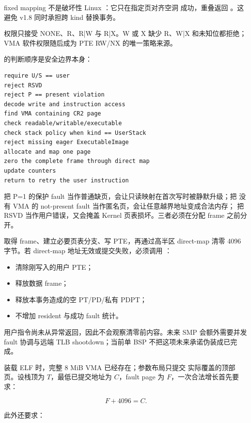 fixed mapping 不是破坏性 Linux ：它只在指定页对齐空洞
成功，重叠返回 。这避免 v1.8 同时承担跨 kind 替换事务。

权限只接受 NONE、R、R|W 与 R|X。W 或 X 缺少 R、W|X 和未知位都拒绝；
VMA 软件权限随后成为 PTE RW/NX 的唯一策略来源。

 的判断顺序是安全边界本身：

\begin{lstlisting}[caption={用户页故障决策顺序}]
require U/S == user
reject RSVD
reject P == present violation
decode write and instruction access
find VMA containing CR2 page
check readable/writable/executable
check stack policy when kind == UserStack
reject missing eager ExecutableImage
allocate and map one page
zero the complete frame through direct map
update counters
return to retry the user instruction
\end{lstlisting}

\begin{failurebox}
把 P=1 的保护 fault 当作普通缺页，会让只读映射在首次写时被静默升级；把
没有 VMA 的 not-present fault 当作匿名页，会让任意越界地址变成合法内存；
把 RSVD 当作用户错误，又会掩盖 Kernel 页表损坏。三者必须在分配 frame
之前分开。
\end{failurebox}

 取得 frame、建立必要页表分支、写 PTE，再通过高半区
direct-map 清零 4096 字节。若 direct-map 地址无效或提交失败，必须调用
：

\begin{itemize}
  \item 清除刚写入的用户 PTE；
  \item 释放数据 frame；
  \item 释放本事务造成的空 PT/PD/私有 PDPT；
  \item 不增加 resident 与成功 fault 统计。
\end{itemize}

用户指令尚未从异常返回，因此不会观察清零前内容。未来 SMP 会额外需要并发
fault 协调与远端 TLB shootdown；当前单 BSP 不把这项未来承诺伪装成已完成。

装载 ELF 时，完整 8 MiB  VMA 已经存在；参数布局只提交
实际覆盖的顶部页。设栈顶为 \(T\)，最低已提交地址为 \(C\)，fault page 为
\(F\)，一次合法增长首先要求：

\[
  F+4096=C.
\]

此外还要求：


